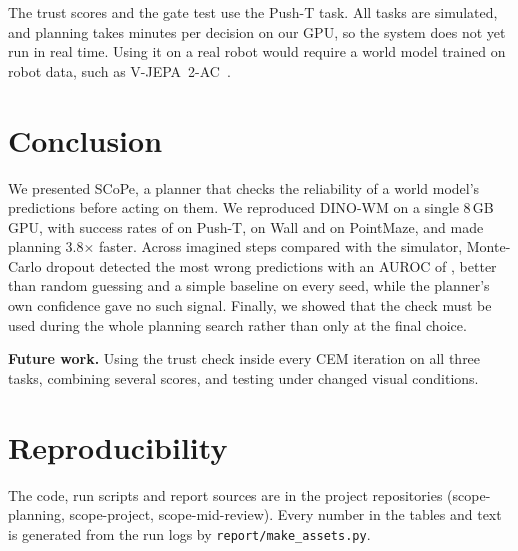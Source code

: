 \documentclass[conference]{IEEEtran}
\begin{document}
The trust scores and the gate test use the Push-T task. All tasks are simulated, and planning takes minutes per
decision on our GPU, so the system does not yet run in real time. Using it on a real robot would require a world model
trained on robot data, such as V-JEPA~2-AC~\cite{ref2}.

\section{Conclusion}

We presented SCoPe, a planner that checks the reliability of a world model's predictions before acting on them. We
reproduced DINO-WM on a single 8\,GB GPU, with success rates of \PushTFinalMean{} on Push-T, \WallFinalMean{} on Wall and
\MazeFinalMean{} on PointMaze, and made planning 3.8$\times$ faster. Across \HPairs{} imagined steps compared with the
simulator, Monte-Carlo dropout detected the most wrong predictions with an AUROC of \HMC{}, better than random guessing
and a simple baseline on every seed, while the planner's own confidence gave no such signal. Finally, we showed that the
check must be used during the whole planning search rather than only at the final choice.

\textbf{Future work.} Using the trust check inside every CEM iteration on all three tasks, combining several scores,
and testing under changed visual conditions.

\section*{Reproducibility}
The code, run scripts and report sources are in the project repositories (scope-planning, scope-project,
scope-mid-review). Every number in the tables and text is generated from the run logs by
\texttt{report/make\_assets.py}.

\balance

\end{document}
